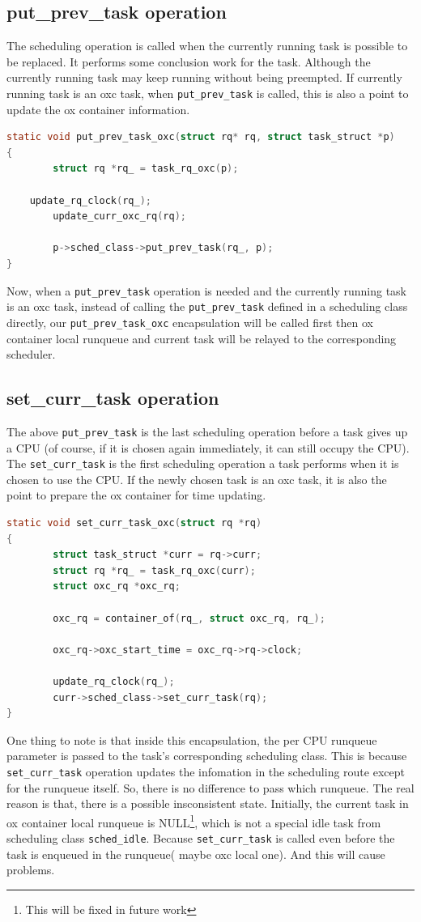 \subsection{put\_prev\_task operation}
The scheduling operation is called when the currently running task is
possible to be replaced. It performs some conclusion work for the task.
Although the currently running task may keep running without being
preempted. If currently running task is an oxc task, when 
\texttt{put\_prev\_task} is called, this is also a point to update 
the ox container information. 
\begin{lstlisting}[language=C, label={list:put_prev}]
static void put_prev_task_oxc(struct rq* rq, struct task_struct *p)
{
        struct rq *rq_ = task_rq_oxc(p);

	update_rq_clock(rq_);
        update_curr_oxc_rq(rq);

        p->sched_class->put_prev_task(rq_, p);
}
\end{lstlisting}
Now, when a \texttt{put\_prev\_task} operation is needed and the
currently running task is an oxc task, instead of calling the 
\texttt{put\_prev\_task} defined in a scheduling class directly, our
\texttt{put\_prev\_task\_oxc} encapsulation will be called first then
ox container local runqueue and current task will be relayed to
the corresponding scheduler.

\subsection{set\_curr\_task operation}
The above \texttt{put\_prev\_task} is the last scheduling operation before 
a task gives up a CPU (of course, if it is chosen again immediately, it
can still occupy the CPU). The \texttt{set\_curr\_task} is the first 
scheduling operation a task performs when it is chosen to use the CPU.
If the newly chosen task is an oxc task, it is also the point to prepare
the ox container for time updating.
\begin{lstlisting}[language=C]
static void set_curr_task_oxc(struct rq *rq)
{
        struct task_struct *curr = rq->curr;
        struct rq *rq_ = task_rq_oxc(curr);
        struct oxc_rq *oxc_rq;

        oxc_rq = container_of(rq_, struct oxc_rq, rq_);

        oxc_rq->oxc_start_time = oxc_rq->rq->clock;

        update_rq_clock(rq_);
        curr->sched_class->set_curr_task(rq);
}
\end{lstlisting}
One thing to note is that inside this encapsulation, the per CPU runqueue
parameter is passed to the task's corresponding scheduling class. This is
because \texttt{set\_curr\_task} operation updates the infomation in the 
scheduling route except for the runqueue itself. So, there is no difference
to pass which runqueue. The real reason is that, there is a possible
insconsistent state. Initially, the current task in ox container local
runqueue is NULL\footnote{This will be fixed in future work}, which is not 
a special idle task from scheduling class \texttt{sched\_idle}. Because
\texttt{set\_curr\_task} is called even before the task is enqueued in the
runqueue( maybe oxc local one). And this will cause problems.

